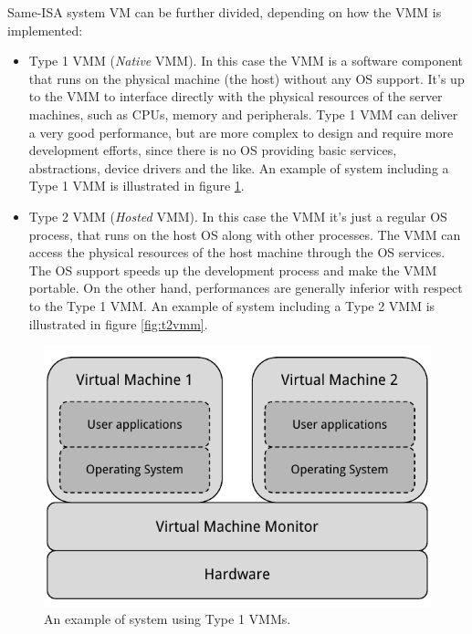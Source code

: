 Same-ISA system VM can be further divided, depending on how the VMM is implemented:
\begin{itemize}
    \item Type 1 VMM (\emph{Native} VMM). In this case the VMM is a software component that runs on the physical machine (the host) 
	  without any OS support.
	  It's up to the VMM to interface directly with the physical resources of the server machines, such as
	  CPUs, memory and peripherals. Type 1 VMM can deliver a very good performance, but are more complex to design and require
	  more development efforts, since there is no OS providing basic services, abstractions, device drivers and the like.
	  An example of system including a Type 1 VMM is illustrated in figure \ref{fig:t1vmm}.
	  
    \item Type 2 VMM (\emph{Hosted} VMM). In this case the VMM it's just a regular OS process, that runs on the host OS along with other
	  processes. The VMM can access the physical resources of the host machine through the OS services. The OS support speeds up
	  the development process and make the VMM portable. On the other hand, performances are generally inferior with respect to the
	  Type 1 VMM. An example of system including a Type 2 VMM is illustrated in figure \ref{fig:t2vmm}.
\end{itemize}

\begin{figure}[bt]
\centering
\includegraphics[scale = 1.0]{type-1-vmm.pdf}
\caption{An example of system using Type 1 VMMs.}
\label{fig:t1vmm}
\end{figure}

